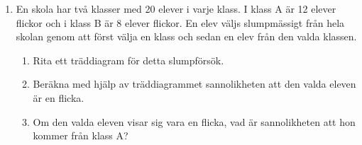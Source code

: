 \documentclass[a4paper,11pt]{article}
\begin{document}
\begin{enumerate}[label=\textbf{\arabic*.}]
    \item En skola har två klasser med 20 elever i varje klass. I klass A är 12 elever flickor och i klass B är 8 elever flickor. En elev väljs slumpmässigt från hela skolan genom att först välja en klass och sedan en elev från den valda klassen.
    \begin{enumerate}[label=\alph*)]
        \item Rita ett träddiagram för detta slumpförsök.
        \item Beräkna med hjälp av träddiagrammet sannolikheten att den valda eleven är en flicka.
        \item Om den valda eleven visar sig vara en flicka, vad är sannolikheten att hon kommer från klass A?
    \end{enumerate}
\end{enumerate}
\end{document}
